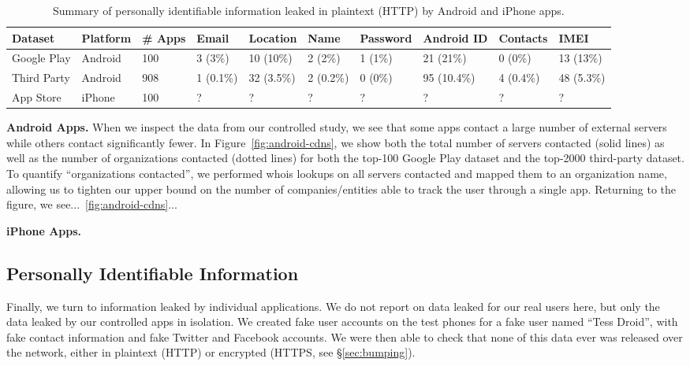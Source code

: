 \begin{table}[t]
    \centering
    \begin{tabular}{l|l|l|l|l|l|l|l|l|l}
       Dataset&Platform&\# Apps&Email&Location&Name&Password&Android ID&Contacts&IMEI\\
       \hline
       \hline
       Google Play&Android&100&3 (3\%)&10 (10\%)&2 (2\%)&1 (1\%)&21 (21\%)&0 (0\%)&13 (13\%)\\
       \hline
       Third Party&Android&908&1 (0.1\%)&32 (3.5\%)&2 (0.2\%)&0 (0\%)&95 (10.4\%)&4 (0.4\%)&48 (5.3\%)\\
       \hline
       App Store&iPhone&100&?&?&?&?&?&?&?\\
    \end{tabular}
    \caption{\label{tbl:pii}Summary of personally identifiable information leaked in plaintext (HTTP) by Android and iPhone apps.}
  \end{table}
  

  {\bf Android Apps.}
  When we inspect the data from our controlled study, we see that some apps contact a large number of external servers while others contact significantly fewer.
  In Figure~\ref{fig:android-cdns}, we show both the total number of servers contacted (solid lines) as well as the number of organizations contacted (dotted lines) for both the top-100 Google Play dataset and the top-2000 third-party dataset.
  To quantify ``organizations contacted'', we performed whois lookups on all servers contacted and mapped them to an organization name, allowing us to tighten our upper bound on the number of companies/entities able to track the user through a single app.
  Returning to the figure, we see...~\ref{fig:android-cdns}...


  {\bf iPhone Apps.}

\subsection{Personally Identifiable Information}
 
  Finally, we turn to information leaked by individual applications. We do not report on data leaked for our real users here, but only the data leaked by our controlled apps in isolation.
  We created fake user accounts on the test phones for a fake user named ``Tess Droid'', with fake contact information and fake Twitter and Facebook accounts. 
  We were then able to check that none of this data ever was released over the network, either in plaintext (HTTP) or encrypted (HTTPS, see \S\ref{sec:bumping}).
  

